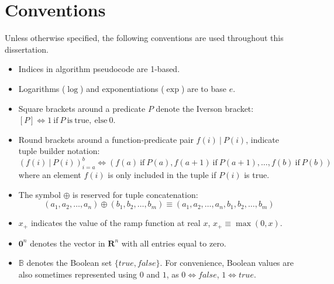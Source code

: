 \chapter*{Conventions}
\label{chap:conventions}
Unless otherwise specified, the following conventions are used throughout this dissertation.

\begin{itemize}
  \item Indices in algorithm pseudocode are 1-based.
  \item Logarithms ($\log$) and exponentiations ($\exp$) are to base $e$.
  \item Square brackets around a predicate $P$ denote the Iverson bracket: $\left[P\right] \Leftrightarrow 1\ \mathrm{if}\ P \mathrm{~is~true,~else}\ 0$.
  \item Round brackets around a function-predicate pair $f(i)~|~P(i)$, indicate tuple builder notation: 
  \[
  \left(f(i)~|~P(i)\right)_{i=a}^b \Leftrightarrow \left( f(a)~\mathrm{if}~P(a), f(a+1)~\mathrm{if}~P(a+1), \dots, f(b)~\mathrm{if}~P(b) \right)
  \]
  where an element $f(i)$ is only included in the tuple if $P(i)$ is true.
  \item The symbol $\oplus$ is reserved for tuple concatenation: 
  \[
  \left(a_1, a_2, \dots, a_n\right) \oplus \left(b_1, b_2, \dots, b_m\right) \equiv \left(a_1, a_2, \dots, a_n, b_1, b_2, \dots, b_m\right)
  \]
  \item $x_+$ indicates the value of the ramp function at real $x$, $x_+ \equiv \max(0, x)$.
  \item $\mathbf{0}^n$ denotes the vector in $\mathbf{R}^n$ with all entries equal to zero.
  \item $\mathbb{B}$ denotes the Boolean set $\{true, false\}$.  For convenience, Boolean values are also sometimes represented using $0$ and $1$, as $0 \Leftrightarrow false$, $1 \Leftrightarrow true$.
\end{itemize}
                                                                 